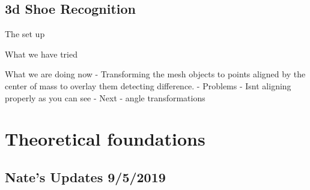\documentclass[]{book}
\begin{document}
\hypertarget{d-shoe-recognition}{%
\section{3d Shoe Recognition}\label{d-shoe-recognition}}

The set up

What we have tried

What we are doing now
- Transforming the mesh objects to points aligned by the center of mass to overlay them detecting difference.
- Problems
- Isnt aligning properly as you can see
- Next
- angle transformations

\hypertarget{theoretical-foundations}{%
\chapter{Theoretical foundations}\label{theoretical-foundations}}

\hypertarget{nates-updates-952019}{%
\section{Nate's Updates 9/5/2019}\label{nates-updates-952019}}
\end{document}
